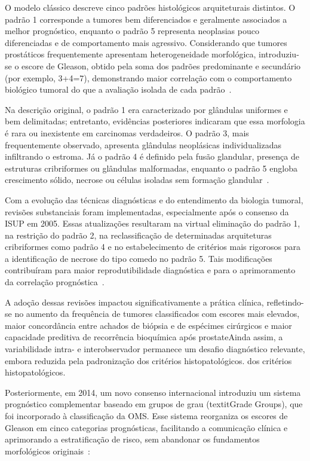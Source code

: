 O modelo clássico descreve cinco padrões histológicos arquiteturais distintos. O padrão 1 corresponde a tumores bem diferenciados e geralmente associados a melhor prognóstico, enquanto o padrão 5 representa neoplasias pouco diferenciadas e de comportamento mais agressivo. Considerando que tumores prostáticos frequentemente apresentam heterogeneidade morfológica, introduziu-se o escore de Gleason, obtido pela soma dos padrões predominante e secundário (por exemplo, 3+4=7), demonstrando maior correlação com o comportamento biológico tumoral do que a avaliação isolada de cada padrão~\cite{chen2016}.

Na descrição original, o padrão 1 era caracterizado por glândulas uniformes e bem delimitadas; entretanto, evidências posteriores indicaram que essa morfologia é rara ou inexistente em carcinomas verdadeiros. O padrão 3, mais frequentemente observado, apresenta glândulas neoplásicas individualizadas infiltrando o estroma. Já o padrão 4 é definido pela fusão glandular, presença de estruturas cribriformes ou glândulas malformadas, enquanto o padrão 5 engloba crescimento sólido, necrose ou células isoladas sem formação glandular~\cite{chen2016}.

Com a evolução das técnicas diagnósticas e do entendimento da biologia tumoral, revisões substanciais foram implementadas, especialmente após o consenso da ISUP em 2005. Essas atualizações resultaram na virtual eliminação do padrão 1, na restrição do padrão 2, na reclassificação de determinadas arquiteturas cribriformes como padrão 4 e no estabelecimento de critérios mais rigorosos para a identificação de necrose do tipo comedo no padrão 5. Tais modificações contribuíram para maior reprodutibilidade diagnóstica e para o aprimoramento da correlação prognóstica~\cite{chen2016}.

A adoção dessas revisões impactou significativamente a prática clínica, refletindo-se no aumento da frequência de tumores classificados com escores mais elevados, maior concordância entre achados de biópsia e de espécimes cirúrgicos e maior capacidade preditiva de recorrência bioquímica após prostateAinda assim, a variabilidade intra- e interobservador permanece um desafio diagnóstico relevante, embora reduzida pela padronização dos critérios histopatológicos. dos critérios histopatológicos.

Posteriormente, em 2014, um novo consenso internacional introduziu um sistema prognóstico complementar baseado em grupos de grau (textit{Grade Groups}), que foi incorporado à classificação da OMS. Esse sistema reorganiza os escores de Gleason em cinco categorias prognósticas, facilitando a comunicação clínica e aprimorando a estratificação de risco, sem abandonar os fundamentos morfológicos originais~\cite{chen2016}:


